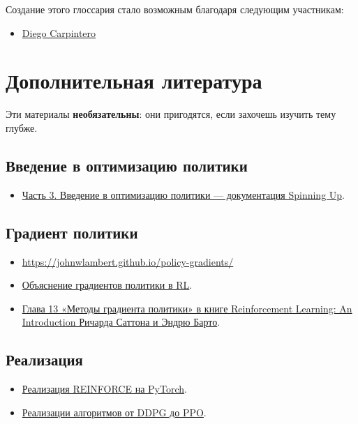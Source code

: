 \documentclass[11pt,a4paper]{article}
\begin{document}
Создание этого глоссария стало возможным благодаря следующим участникам:

\begin{itemize}
\tightlist
\item
  \href{https://github.com/dcarpintero}{Diego Carpintero}
\end{itemize}

\section{Дополнительная литература}\label{additional-readings}

Эти материалы \textbf{необязательны}: они пригодятся, если захочешь изучить тему глубже.

\subsection{Введение в оптимизацию политики}\label{introduction-to-policy-optimization}

\begin{itemize}
\tightlist
\item
  \href{https://spinningup.openai.com/en/latest/spinningup/rl_intro3.html}{Часть 3. Введение в оптимизацию политики --- документация Spinning Up}.
\end{itemize}

\subsection{Градиент политики}\label{policy-gradient}

\begin{itemize}
\tightlist
\item
  \url{https://johnwlambert.github.io/policy-gradients/}
\item
  \href{https://jonathan-hui.medium.com/rl-policy-gradients-explained-9b13b688b146}{Объяснение градиентов политики в RL}.
\item
  \href{http://incompleteideas.net/book/RLbook2020.pdf}{Глава 13 «Методы градиента политики» в книге Reinforcement Learning: An Introduction Ричарда Саттона и Эндрю Барто}.
\end{itemize}

\subsection{Реализация}\label{implementation}

\begin{itemize}
\tightlist
\item
  \href{https://github.com/pytorch/examples/blob/main/reinforcement_learning/reinforce.py}{Реализация REINFORCE на PyTorch}.
\item
  \href{https://github.com/MrSyee/pg-is-all-you-need}{Реализации алгоритмов от DDPG до PPO}.
\end{itemize}

\endgroup
\end{document}
